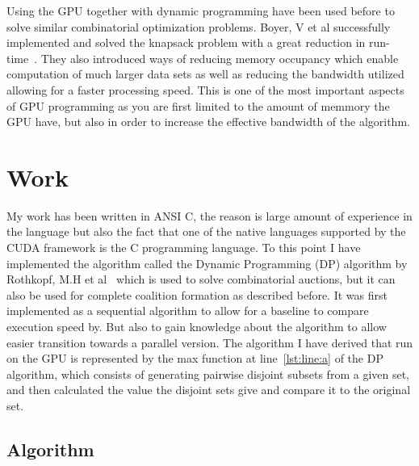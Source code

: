 \documentclass[a4paper, 12pt]{report}
\begin{document}
Using the GPU together with dynamic programming have been used before to solve similar combinatorial optimization problems.
Boyer, V et al successfully implemented and solved the knapsack problem with a great reduction in run-time~\cite{boyer2012solving}.
They also introduced ways of reducing memory occupancy which enable computation of much larger data sets as well as reducing the bandwidth utilized allowing for a faster processing speed.
This is one of the most important aspects of GPU programming as you are first limited to the amount of memmory the GPU have, but also in order to increase the effective bandwidth of the algorithm.





\section{Work}
My work has been written in ANSI C, the reason is large amount of experience in the language but also the fact that one of the native languages supported by the CUDA framework is the C programming language.
To this point I have implemented the algorithm called the Dynamic Programming (DP) algorithm by Rothkopf, 
M.H et al~\cite{rothkopf1998computationally} which is used to solve combinatorial auctions, but it can also be used for complete coalition formation as described before.
It was first implemented as a sequential algorithm to allow for a baseline to compare execution speed by.
But also to gain knowledge about the algorithm to allow easier transition towards a parallel version.
The algorithm I have derived that run on the GPU is represented by the max function at line~\ref{lst:line:a} of the DP algorithm, 
which consists of generating pairwise disjoint subsets from a given set, and then calculated the value the disjoint sets give and compare it to the original set. 

\thispagestyle{empty}

\thispagestyle{empty}
\pagestyle{empty}
\subsection{Algorithm}
\end{document}

